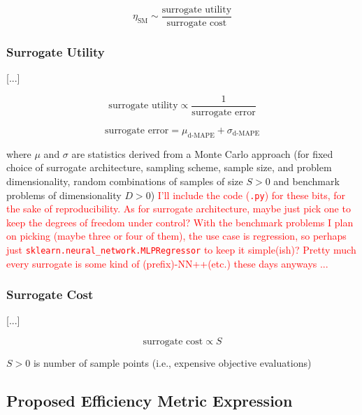\documentclass[conference]{IEEEtran}
\begin{document}
\begin{equation}
	\eta_\textrm{SM} \sim \frac{\textrm{surrogate utility}}{\textrm{surrogate cost}}
	\label{eqn:efficiency_concept}
\end{equation}

\subsubsection{Surrogate Utility}

[...]

\begin{equation}
	\textrm{surrogate utility} \propto \frac{1}{\textrm{surrogate error}}
	\label{eqn:surrogate_utility_concept}
\end{equation}

\begin{equation}
	\textrm{surrogate error} = \mu_\textrm{d-MAPE} + \sigma_\textrm{d-MAPE}
	\label{eqn:surrogate_error}
\end{equation}

\noindent where $\mu$ and $\sigma$ are statistics derived from a Monte Carlo approach (for fixed choice of surrogate architecture, sampling scheme, sample size, and problem dimensionality, random combinations of samples of size $S>0$ and benchmark problems of dimensionality $D>0$) \textcolor{red}{I'll include the code (\texttt{.py}) for these bits, for the sake of reproducibility. As for surrogate architecture, maybe just pick one to keep the degrees of freedom under control? With the benchmark problems I plan on picking (maybe three or four of them), the use case is regression, so perhaps just \texttt{sklearn.neural\_network.MLPRegressor} to keep it simple(ish)? Pretty much every surrogate is some kind of (prefix)-NN++(etc.) these days anyways ...}

\subsubsection{Surrogate Cost}

[...]

\begin{equation}
	\textrm{surrogate cost} \propto S
	\label{eqn:surrogate_cost_concept}
\end{equation}

\noindent $S>0$ is number of sample points (i.e., expensive objective evaluations)

\subsection{Proposed Efficiency Metric Expression}
\end{document}
